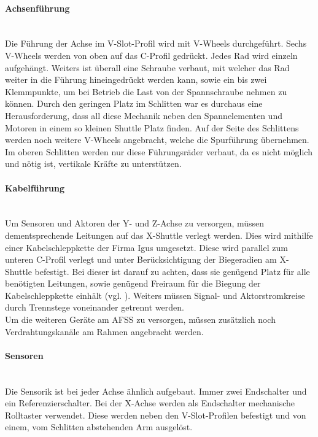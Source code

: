 \paragraph{Achsenführung} \mbox{}\\
Die Führung der Achse im V-Slot-Profil wird mit V-Wheels durchgeführt. Sechs V-Wheels werden von oben auf das C-Profil gedrückt. Jedes Rad wird einzeln aufgehängt. Weiters ist überall eine Schraube verbaut, mit welcher das Rad weiter in die Führung hineingedrückt werden kann, sowie ein bis zwei Klemmpunkte, um bei Betrieb die Last von der Spannschraube nehmen zu können. Durch den geringen Platz im Schlitten war es durchaus eine Herausforderung, dass all diese Mechanik neben den Spannelementen und Motoren in einem so kleinen Shuttle Platz finden. Auf der Seite des Schlittens werden noch weitere V-Wheels angebracht, welche die Spurführung übernehmen.
Im oberen Schlitten werden nur diese Führungsräder verbaut, da es nicht möglich und nötig ist, vertikale Kräfte zu unterstützen.

\paragraph{Kabelführung} \mbox{}\\
Um Sensoren und Aktoren der Y- und Z-Achse zu versorgen, müssen dementsprechende Leitungen auf das X-Shuttle verlegt werden. Dies wird mithilfe einer Kabelschleppkette der Firma Igus umgesetzt. Diese wird parallel zum unteren C-Profil verlegt und unter Berücksichtigung der Biegeradien am X-Shuttle befestigt. Bei dieser ist darauf zu achten, dass sie genügend Platz für alle benötigten Leitungen, sowie genügend Freiraum für die Biegung der Kabelschleppkette einhält (vgl. \cite{igus_freitragend}). Weiters müssen Signal- und Aktorstromkreise durch Trennstege voneinander getrennt werden.
\\
Um die weiteren Geräte am AFSS zu versorgen, müssen zusätzlich noch Verdrahtungskanäle am Rahmen angebracht werden.

\paragraph{Sensoren}\mbox{}\\
Die Sensorik ist bei jeder Achse ähnlich aufgebaut. Immer zwei Endschalter und ein Referenzierschalter. Bei der X-Achse werden als Endschalter mechanische Rolltaster verwendet. Diese werden neben den V-Slot-Profilen befestigt und von einem, vom Schlitten abstehenden Arm ausgelöst.


